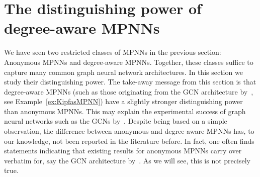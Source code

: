 




\section{The distinguishing power of degree-aware MPNNs}





We have seen two restricted classes of MPNNs in the previous section: Anonymous MPNNs and degree-aware MPNNs. Together, these classes suffice to capture many common graph neural network architectures. In this section we study their distinguishing power. The take-away message from this section is that degree-aware MPNNs (such as those originating from the GCN architecture by~\cite{kipf-loose}, see Example~\ref{ex:KipfasMPNN}) have a slightly stronger distinguishing power than anonymous MPNNs. This may explain the experimental success of graph neural networks such as the GCNs by~\cite{kipf-loose}. Despite being based on a simple observation, the difference between anonymous and degree-aware MPNNs has, to our knowledge, not been reported in the literature before. In fact, one often finds statements indicating that existing results for anonymous MPNNs \cite{xhlj19,grohewl} carry over verbatim for, say the GCN architecture
by~\cite{kipf-loose}. As we will see, this is not precisely true.

